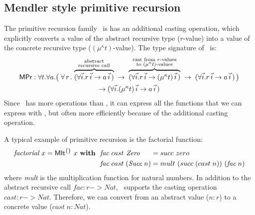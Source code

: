 \subsection{Mendler style primitive recursion}\label{sec:mendler:pr}
The primitive recursion family \MPr\ is has an additional casting operation,
which explicitly converts a value of the abstract recursive type ($r$-value)
into a value of the concrete recursive type ($(\mu^\kappa t)$-value).
The type signature of \MPr\ is:
\begin{multline*}
 \textsf{MPr} : \forall t . \forall a .
   \big(\; \forall\, r\, . \;
         \overset{\begin{smallmatrix}
                        \text{abstract} \\
                        \text{recursive call}
                       \end{smallmatrix}}{\overbrace{
            (\forall\vec{i} . r\,\vec{i} -> a\,\vec{i}\,) }} \;
   -> \; \overset{\begin{smallmatrix}
                        \text{cast from $r$-values} \\
                        \text{to $(\mu^\kappa t)$-values} \\
                       \end{smallmatrix}}{\overbrace{
            (\forall\vec{i} . r\,\vec{i} -> (\mu^\kappa t)\,\vec{i}\,) }} \;
   -> \;    (\forall\vec{i} . r\,\vec{i} -> a\,\vec{i}\,) \,
   \big) \\
 -> (\forall\vec{i} . (\mu^\kappa t)\,\vec{i} -> a\,\vec{i}\,)
\end{multline*}
Since \MPr\ has more operations than \MIt, it can express all the functions
that we can express with \MIt, but often more efficiently because of the
additional casting operation.

A typical example of primitive recursion is the factorial function:
\begin{align*}
\textit{factorial}~x = \textsf{MIt}^{\{\}}~x~\textbf{with}~~
&  \textit{fac} ~cast ~\textit{Zero}~~~~\; = succ~zero \\
&  \textit{fac} ~cast \;(\textit{Succ}\;n) = mult~(succ\;(cast\;n))~(\textit{fac}\;n)
\end{align*}
where \textit{mult} is the multiplication function for natural numbers.
In addition to the abstract recursive call $\textit{fac} : r -> \textit{Nat}$,
\MPr\ supports the casting operation $cast : r -> \textit{Nat}$.
Therefore, we can convert from an abstract value ($n : r$) to
a concrete value ($cast\;n : \textit{Nat}$).

